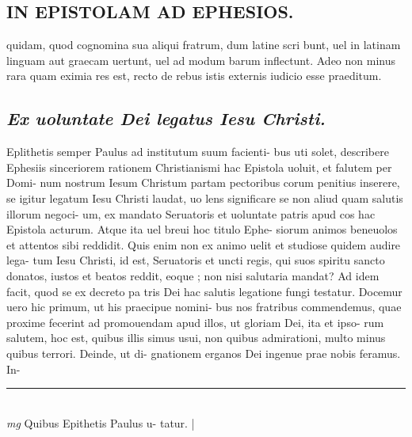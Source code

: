 \documentclass{article}
\begin{document}
\begin{pages}
\section*{IN EPISTOLAM AD EPHESIOS.  }\pstart quidam, quod cognomina sua aliqui fratrum, dum latine scri bunt, uel in latinam linguam aut graecam uertunt, uel ad modum barum inflectunt. Adeo non minus rara quam eximia res est, recto de rebus istis externis iudicio esse praeditum.   \pend
{}
{}
\subsection*{\textit{Ex uoluntate Dei legatus Iesu Christi. }}\pstart Eplithetis semper Paulus ad institutum suum facienti- bus uti solet, describere Ephesiis sinceriorem rationem Christianismi hac Epistola uoluit, et falutem per Domi- num nostrum Iesum Christum partam pectoribus   corum penitius inserere, se igitur legatum Iesu Christi laudat, uo lens significare se non aliud quam salutis illorum negoci- um, ex mandato Seruatoris et uoluntate patris apud cos hac Epistola acturum.  Atque  ita uel breui hoc titulo Ephe- siorum animos beneuolos et attentos sibi reddidit.  Quis enim non ex animo uelit et studiose quidem audire lega- tum Iesu Christi, id est, Seruatoris et uncti regis, qui suos spiritu sancto donatos, iustos et beatos reddit, eoque ; non nisi salutaria mandat? Ad idem facit, quod se ex decreto pa tris Dei hac salutis legatione fungi testatur.   \pend\pstart Docemur uero hic primum, ut his praecipue nomini- bus nos fratribus commendemus, quae proxime fecerint ad promouendam apud illos, ut gloriam Dei, ita et ipso- rum salutem, hoc est, quibus illis simus usui, non quibus admirationi, multo minus quibus terrori.  Deinde, ut di- gnationem erganos Dei ingenue prae nobis feramus.  In-  \pend
\vspace{0.5cm}\noindent
\vspace{0.2cm}\rule{1cm}{0.2pt}\\ 
\hspace{0.2cm}\textit{mg}
\footnotesize Quibus Epithetis Paulus u- tatur.  
\normalsize| 

\end{pages}
\end{document}
